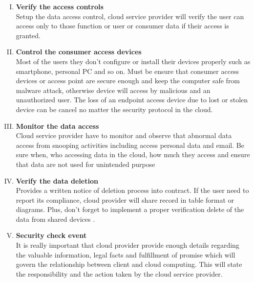 \documentclass[a4paper, 12pt]{article}
\begin{document}
\begin{enumerate}[I. ]

\item \textbf{Verify the access controls} \\
Setup the data access control, cloud service provider will verify the user can access only to those function or user or consumer data if their access is granted.

\item \textbf{Control the consumer access devices} \\
Most of the users they don't configure or install their devices properly such as smartphone, personal PC and so on. Must be ensure that consumer access devices or access point are secure enough and keep the computer safe from malware attack, otherwise device will access by malicious and an unauthorized user. The loss of an endpoint access device due to lost or stolen device can be cancel no matter the security protocol in the cloud.

\item \textbf{Monitor the data access} \\
Cloud service provider have to monitor and observe that abnormal data access from snooping activities including access personal data and email. Be sure when, who accessing data in the cloud, how much they access and ensure that data are not used for unintended purpose

\item \textbf{Verify the data deletion} \\
Provides a written notice of deletion process into contract. If the user need to report its compliance, cloud provider will share record in table format or diagrams. Plus, don't forget to implement a proper verification delete of the data from shared devices  \cite{starek1999method}.

\item \textbf{Security check event} \\
It is really important that cloud provider provide enough details regarding the valuable information, legal facts and fulfillment of promise which will govern the relationship between client and cloud computing. This will state the responsibility and the action taken by the cloud service provider.

\end{enumerate}

\pagebreak

{}

\pagebreak
\end{document}

